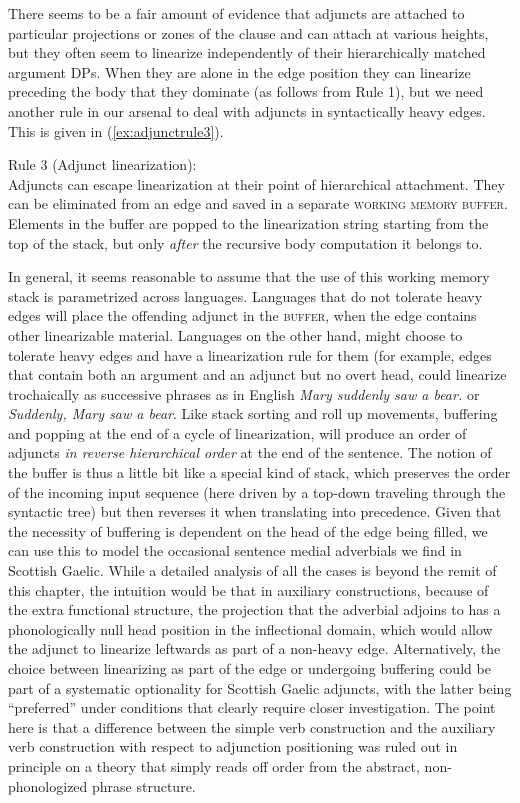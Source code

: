 \documentclass[output=paper,colorlinks,citecolor=brown]{langscibook}
\begin{document}
There seems to be a fair amount of evidence that adjuncts are attached to particular projections or zones of the clause and can attach at various heights, but they often seem to linearize independently of their hierarchically matched argument DPs. When they are alone in the edge position they can linearize preceding the body that they dominate (as follows from Rule 1), but we need another rule in our arsenal to deal with adjuncts in syntactically heavy edges. This is given in (\ref{ex:adjunctrule3}). 

\eanoraggedright\label{ex:adjunctrule3}
Rule 3 (Adjunct linearization):\smallskip\\
Adjuncts can escape linearization at their point of hierarchical attachment. They can be eliminated from an edge  and  saved in a separate \textsc{working memory buffer}.  Elements in the buffer are popped to the  linearization string starting from the top of the stack,  but only \textit{after} the recursive body computation it belongs to. 
\z

In general, it seems reasonable to assume that the use of this working memory stack  is parametrized across languages. Languages that do not tolerate heavy edges will place the offending adjunct in the \textsc{buffer}, when the edge contains other linearizable material.  Languages on the other hand, might choose to tolerate heavy edges and have a linearization rule for them (for example, edges that contain both an argument and an adjunct but no overt head,  could linearize trochaically as successive phrases as in English \textit{Mary suddenly saw a bear.} or \textit{Suddenly, Mary saw a bear}. Like stack sorting and roll up movements, buffering and popping at the end of a cycle of linearization, will produce an order  of adjuncts \textit{in reverse hierarchical order} at the end of the sentence. The notion of the buffer is thus a little bit like a special kind of stack, which preserves the order of the incoming input sequence (here driven by a top-down traveling through the syntactic tree) but then reverses it when translating into precedence.  Given that the necessity of buffering is dependent on the head of the edge being filled, we can use this to model the occasional sentence medial adverbials we find in Scottish Gaelic. While a detailed analysis of all the cases is beyond the remit of this chapter, the intuition would be that in auxiliary constructions, because of the extra functional structure,  the projection that the adverbial adjoins to has a phonologically null head  position in the inflectional domain, which would allow the adjunct to linearize leftwards as part of a non-heavy edge. Alternatively, the choice between linearizing as part of the edge or undergoing buffering could be part of a systematic optionality for Scottish Gaelic adjuncts, with the latter being “preferred”  under conditions that clearly require closer investigation. The point here is that a difference between the simple verb construction and the auxiliary verb construction with respect to adjunction positioning was ruled out in principle on a theory that simply reads off order from the abstract, non-phonologized phrase structure. 
\end{document}
